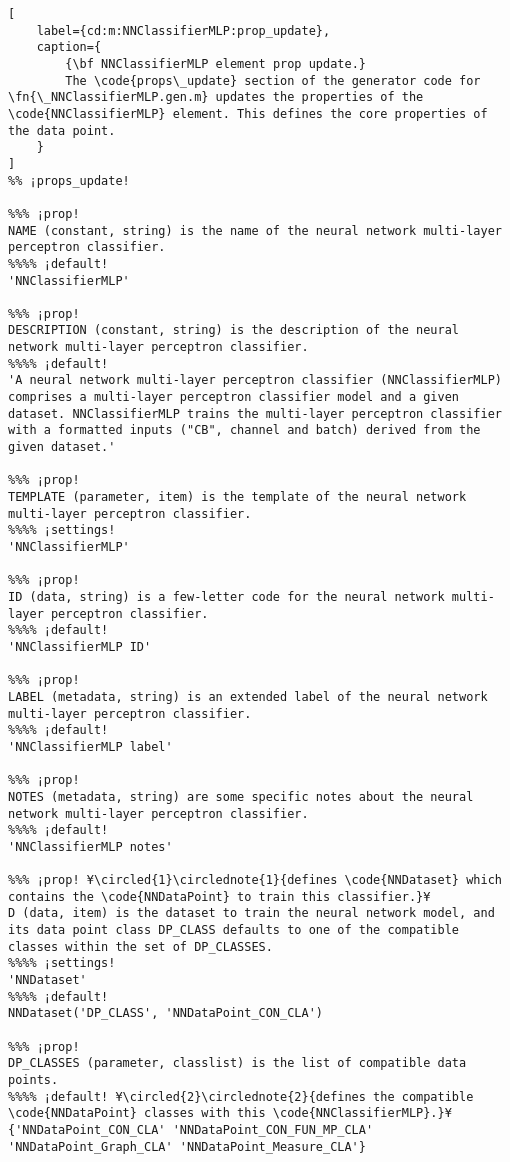 \documentclass{tufte-handout}
\begin{document}
\begin{lstlisting}[
	label={cd:m:NNClassifierMLP:prop_update},
	caption={
		{\bf NNClassifierMLP element prop update.}
		The \code{props\_update} section of the generator code for \fn{\_NNClassifierMLP.gen.m} updates the properties of the \code{NNClassifierMLP} element. This defines the core properties of the data point.
	}
]
%% ¡props_update!

%%% ¡prop!
NAME (constant, string) is the name of the neural network multi-layer perceptron classifier.
%%%% ¡default!
'NNClassifierMLP'

%%% ¡prop!
DESCRIPTION (constant, string) is the description of the neural network multi-layer perceptron classifier.
%%%% ¡default!
'A neural network multi-layer perceptron classifier (NNClassifierMLP) comprises a multi-layer perceptron classifier model and a given dataset. NNClassifierMLP trains the multi-layer perceptron classifier with a formatted inputs ("CB", channel and batch) derived from the given dataset.'

%%% ¡prop!
TEMPLATE (parameter, item) is the template of the neural network multi-layer perceptron classifier.
%%%% ¡settings!
'NNClassifierMLP'

%%% ¡prop!
ID (data, string) is a few-letter code for the neural network multi-layer perceptron classifier.
%%%% ¡default!
'NNClassifierMLP ID'

%%% ¡prop!
LABEL (metadata, string) is an extended label of the neural network multi-layer perceptron classifier.
%%%% ¡default!
'NNClassifierMLP label'

%%% ¡prop!
NOTES (metadata, string) are some specific notes about the neural network multi-layer perceptron classifier.
%%%% ¡default!
'NNClassifierMLP notes'

%%% ¡prop! ¥\circled{1}\circlednote{1}{defines \code{NNDataset} which contains the \code{NNDataPoint} to train this classifier.}¥
D (data, item) is the dataset to train the neural network model, and its data point class DP_CLASS defaults to one of the compatible classes within the set of DP_CLASSES.
%%%% ¡settings!
'NNDataset'
%%%% ¡default!
NNDataset('DP_CLASS', 'NNDataPoint_CON_CLA')

%%% ¡prop!
DP_CLASSES (parameter, classlist) is the list of compatible data points. 
%%%% ¡default! ¥\circled{2}\circlednote{2}{defines the compatible \code{NNDataPoint} classes with this \code{NNClassifierMLP}.}¥
{'NNDataPoint_CON_CLA' 'NNDataPoint_CON_FUN_MP_CLA' 'NNDataPoint_Graph_CLA' 'NNDataPoint_Measure_CLA'}


\end{lstlisting}
\end{document}
